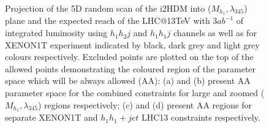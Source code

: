 \documentclass[12pt,a4paper]{article}
\begin{document}
\begin{figure}[htb]
\vskip -0.5cm
%
\\
%
\vskip -0.3cm
\caption{Projection of the 5D random scan of the i2HDM into ($M_{h_1},\lambda_{345}$)
plane and the expected  reach of the LHC@13TeV with 3$ab^{-1}$ of integrated luminosity 
using  $h_1 h_2 j$  and  $h_1 h_1 j$ channels as well as for XENON1T experiment
indicated by black,
dark grey and light grey colours respectively.
Excluded points are plotted on the top of the allowed points   demonstrating the coloured region of the parameter space which will be always allowed (AA):
(a) and (b)
present AA parameter space for the combined constraints for 
large and zoomed ($M_{h_1},\lambda_{345}$) regions respectively;
(c) and (d)
present AA regions for separate  XENON1T and $h_1h_1+jet$ LHC13 constraints
respectively.
\label{collider-XENON1T-constraint}} 
\end{figure}
\end{document}

